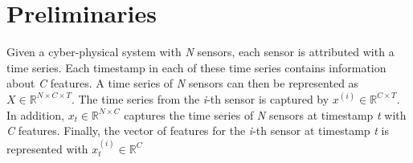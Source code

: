 \section{Preliminaries}
Given a cyber-physical system with \textit{N} sensors, each sensor is attributed with a time series.
Each timestamp in each of these time series contains information about \textit{C} features.
A time series of \textit{N} sensors can then be represented as \(X \in \mathbb{R}^{N \times C \times T}\).
The time series from the \textit{i}-th sensor is captured by \(x^{(i)} \in \mathbb{R}^{C \times T} \).
In addition, \(x_{t} \in \mathbb{R}^{N \times C}\) captures the time series of \textit{N} sensors at timestamp \textit{t} with \textit{C} features.
Finally, the vector of features for the \textit{i}-th sensor at timestamp \textit{t} is represented with \(x_{t}^{(i)} \in \mathbb{R}^{C}\)